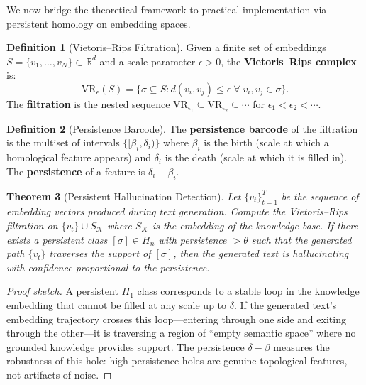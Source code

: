 \documentclass[11pt,a4paper,twocolumn]{article}
\theoremstyle{plain}
\newtheorem{theorem}{Theorem}[section]
\theoremstyle{definition}
\newtheorem{definition}[theorem]{Definition}
\newcommand{\VR}{\mathrm{VR}}
\begin{document}
We now bridge the theoretical framework to practical implementation via persistent homology on embedding spaces.

\begin{definition}[Vietoris--Rips Filtration]\label{def:vr}
Given a finite set of embeddings $S = \{v_1, \ldots, v_N\} \subset \mathbb{R}^d$ and a scale parameter $\epsilon > 0$, the \textbf{Vietoris--Rips complex} is:
\[
  \VR_\epsilon(S) = \{\sigma \subseteq S : d(v_i, v_j) \leq \epsilon \;\forall\; v_i, v_j \in \sigma\}.
\]
The \textbf{filtration} is the nested sequence $\VR_{\epsilon_1} \subseteq \VR_{\epsilon_2} \subseteq \cdots$ for $\epsilon_1 < \epsilon_2 < \cdots$.
\end{definition}

\begin{definition}[Persistence Barcode]\label{def:barcode}
The \textbf{persistence barcode} of the filtration is the multiset of intervals $\{[\beta_i, \delta_i)\}$ where $\beta_i$ is the birth (scale at which a homological feature appears) and $\delta_i$ is the death (scale at which it is filled in). The \textbf{persistence} of a feature is $\delta_i - \beta_i$.
\end{definition}

\begin{theorem}[Persistent Hallucination Detection]\label{thm:persistent}
Let $\{v_t\}_{t=1}^T$ be the sequence of embedding vectors produced during text generation. Compute the Vietoris--Rips filtration on $\{v_t\} \cup S_{\mathcal{K}}$ where $S_{\mathcal{K}}$ is the embedding of the knowledge base. If there exists a persistent class $[\sigma] \in H_n$ with persistence $> \theta$ such that the generated path $\{v_t\}$ traverses the support of $[\sigma]$, then the generated text is hallucinating with confidence proportional to the persistence.
\end{theorem}

\begin{proof}[Proof sketch]
A persistent $H_1$ class corresponds to a stable loop in the knowledge embedding that cannot be filled at any scale up to $\delta$. If the generated text's embedding trajectory crosses this loop---entering through one side and exiting through the other---it is traversing a region of ``empty semantic space'' where no grounded knowledge provides support. The persistence $\delta - \beta$ measures the robustness of this hole: high-persistence holes are genuine topological features, not artifacts of noise.
\end{proof}
\end{document}
